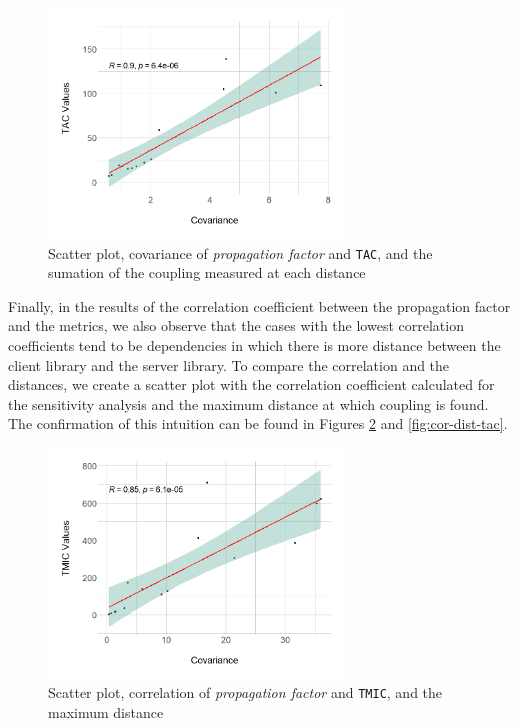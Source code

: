 \begin{figure}[ht!]
\begin{center}
\includegraphics[width=0.7\textwidth]{figures/results/covariance-values-tac.png}
\caption{Scatter plot, covariance of \textit{propagation factor} and \texttt{TAC}, and the sumation of the coupling measured at each distance}
\label{fig:cov-value-tac}
\end{center}
\end{figure}

Finally, in the results of the correlation coefficient between the propagation factor and the metrics, we also observe that the cases with the lowest correlation coefficients tend to be dependencies in which there is more distance between the client library and the server library. To compare the correlation and the distances, we create a scatter plot with the correlation coefficient calculated for the sensitivity analysis and the maximum distance at which coupling is found. The confirmation of this intuition can be found in Figures \ref{fig:cor-dist-tmic} and \ref{fig:cor-dist-tac}.

\begin{figure}[ht!]
\begin{center}
\includegraphics[width=0.7\textwidth]{figures/results/covariance-values-tmic.png}
\caption{Scatter plot, correlation of \textit{propagation factor} and \texttt{TMIC}, and the maximum distance}
\label{fig:cor-dist-tmic}
\end{center}
\end{figure}

